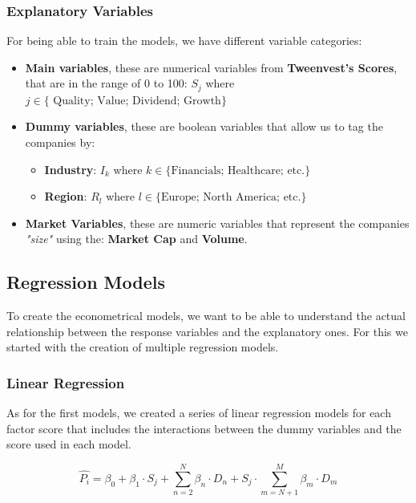 \documentclass[11pt,english,a4paper,hidelinks]{book}
\begin{document}
\subsubsection{Explanatory Variables}
For being able to train the models, we have different variable categories:

\begin{itemize}
    \item \textbf{Main variables}, these are numerical variables from \textbf{Tweenvest's Scores}, that are in the range of 0 to 100: \(S_j\) where   \(j \in \{\text{ Quality; Value; Dividend; Growth}\}\)
    \item \textbf{Dummy variables}, these are boolean variables that allow us to tag the companies by:
    \begin{itemize}
        \item \textbf{Industry}: \(I_k\) where \(k \in \{\text{Financials; Healthcare; etc.}\}\)
        \item \textbf{Region}: \(R_l\) where \(l \in \{\text{Europe; North America; etc.}\}\)
    \end{itemize}
    \item \textbf{Market Variables}, these are numeric variables that represent the companies \textit{"size"} using the: \textbf{Market Cap} and \textbf{Volume}.
\end{itemize}

\subsection{Regression Models}

To create the econometrical models, we want to be able to understand the actual relationship between the response variables and the explanatory ones. For this we started with the creation of multiple regression models.

\subsubsection{Linear Regression}

As for the first models, we created a series of linear regression models for each factor score that
includes the interactions between the dummy variables and the score used in each model.

\begin{equation}
    \hat{P_i}=\beta_0+\beta_1 \cdot S_j + 
\sum_{n=2}^{N}\beta_{n}\cdot D_n + S_j \cdot \sum_{m=N+1}^{M}\beta_{m}\cdot D_m
\end{equation}
\end{document}
